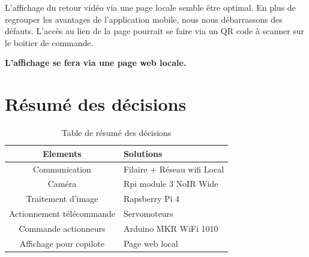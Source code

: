 L'affichage du retour vidéo via une page locale semble être optimal. En plus de regrouper les avantages de l'application mobile, nous nous débarrassons des défauts.
L'accès au lien de la page pourrait se faire via un QR code à scanner sur le boitier de commande.

\textbf{L'affichage se fera via une page web locale.}

\section{Résumé des décisions}
\begin{table}[H]
    \begin{center}
        \caption{Table de résumé des décisions}
        \begin{tabular}{|c|l|}
            Elements                  & Solutions                         \\ \hline
            Communication             & Filaire + Réseau \Gls{wifi} Local \\
            Caméra                    & Rpi module 3 NoIR Wide            \\
            Traitement d'image        & Rapsberry Pi 4                    \\
            Actionnement télécommande & Servomoteurs                      \\
            Commande actionneurs      & Arduino MKR WiFi 1010 \cite{MKR}  \\
            Affichage pour copilote   & Page web local                    \\
        \end{tabular}
    \end{center}
\end{table}

